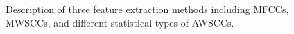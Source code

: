 \begin{figure}[htb!] %
\caption[Process for extraction MFCCs, MWSCCs, and different statistical types of AWSCCs]{Description of three feature extraction methods including MFCCs, MWSCCs, and different statistical types of AWSCCs.}
\label{fig:featureExtraction} 
\end{figure}


